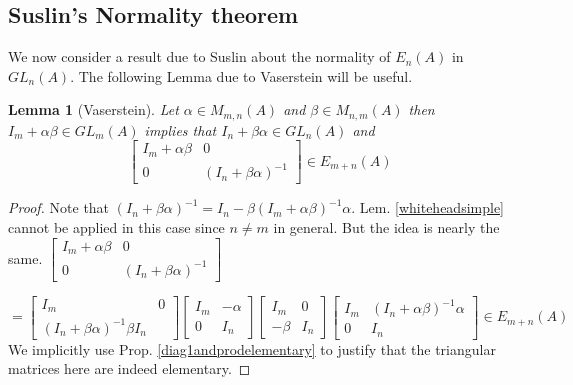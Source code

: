 \documentclass[12pt]{article}
\numberwithin{equation}{section}
\newcounter{dummy} \numberwithin{dummy}{section}
\newtheorem{lemma}[dummy]{Lemma}
\begin{document}
	\subsection{Suslin's Normality theorem}
		We now consider a result due to Suslin about the normality of $E_n(A) $ in $GL_n(A)$. The following Lemma due to Vaserstein will be useful.
		\begin{lemma}[Vaserstein]\label{vasersteinlem}
			Let $\alpha \in M_{m,n} (A)$ and $\beta \in M_{n,m}(A)$ then $I_m+\alpha \beta \in GL_m(A)$ implies that $I_n+\beta \alpha \in GL_n(A)$ and \[ \begin{bmatrix}
				I_m+\alpha \beta & 0 \\ 0 & (I_n+\beta \alpha)^{-1}
			\end{bmatrix} \in E_{m+n} (A)\] 
		\end{lemma}
		\begin{proof}
			Note that $(I_n+\beta \alpha )^{-1}=I_n-\beta (I_m+\alpha \beta )^{-1} \alpha$. Lem. \ref{whiteheadsimple} cannot be applied in this case since $n\neq m$ in general. But the idea is nearly the same. 
			\( \begin{bmatrix}
				I_m+\alpha \beta & 0 \\ 0 & (I_n+\beta \alpha)^{-1}
			\end{bmatrix} 
			\)
			
			
			\(=\begin{bmatrix}
			I_m & 0 \\
			(I_n+\beta \alpha )^{-1}\beta I_n
			\end{bmatrix}\begin{bmatrix}
			I_m & -\alpha \\
			0 & I_n
			\end{bmatrix} \begin{bmatrix}
			I_m & 0\\
			-\beta  & I_n
			\end{bmatrix} \begin{bmatrix}
			I_m & (I_n+\alpha \beta )^{-1} \alpha \\
			0 & I_n
			\end{bmatrix}\in E_{m+n} (A)\) 
			We implicitly use Prop. \ref{diag1andprodelementary} to justify that the triangular matrices here are indeed elementary.
		\end{proof}
		
\end{document}
